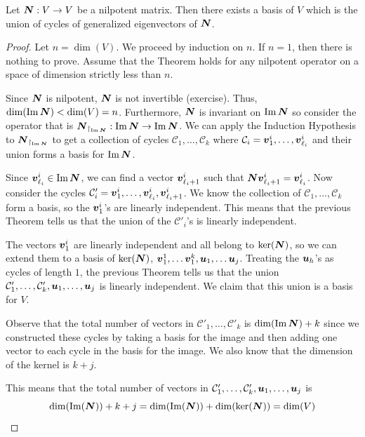 \begin{theorem}
    Let $\boldsymbol{N}:V\to V$ be a nilpotent matrix. Then there exists a basis of $V$ which is the union of cycles of generalized eigenvectors of $\boldsymbol{N}$.
\end{theorem}

\begin{proof}
    Let $n=\dim(V)$. We proceed by induction on $n$. If $n=1$, then there is nothing to prove. Assume that the Theorem holds for any nilpotent operator on a space of dimension strictly less than $n$.

    Since $\boldsymbol{N}$ is nilpotent, $\boldsymbol{N}$ is not invertible (exercise). Thus, $\dim(\operatorname{Im}\boldsymbol{N})<\dim(V)=n$. Furthermore, $\boldsymbol{N}$ is invariant on $\operatorname{Im}\boldsymbol{N}$ so consider the operator that is $\boldsymbol{N}_{\restriction_{\operatorname{Im}\boldsymbol{N}}}:\operatorname{Im}\boldsymbol{N}\to \operatorname{Im}\boldsymbol{N}$. We can apply the Induction Hypothesis to $\boldsymbol{N}_{\restriction_{\operatorname{Im}\boldsymbol{N}}}$ to get a collection of cycles $\mathcal{C}_1,\dots,\mathcal{C}_k$ where $\mathcal{C}_i=\boldsymbol{v}^i_1,\dots,\boldsymbol{v}^i_{\ell_i}$ and their union forms a basis for $\operatorname{Im}\boldsymbol{N}$.

    Since $\boldsymbol{v}^i_{\ell_i}\in\operatorname{Im}\boldsymbol{N}$, we can find a vector $\boldsymbol{v}^i_{\ell_i+1}$ such that $\boldsymbol{N}\boldsymbol{v}^i_{\ell_i+1}=\boldsymbol{v}^i_{\ell_i}$. Now consider the cycles $\mathcal{C}_i'=\boldsymbol{v}^i_1,\dots,\boldsymbol{v}^i_{\ell_i},\boldsymbol{v}^i_{\ell_i+1}$. We know the collection of $\mathcal{C}_1,\dots,\mathcal{C}_k$ form a basis, so the $\boldsymbol{v}_1^i$'s are linearly independent. This means that the previous Theorem tells us that the union of the $\mathcal{C}'_i$'s is linearly independent.

    The vectors $\boldsymbol{v}^i_1$ are linearly independent and all belong to $\ker(\boldsymbol{N})$, so we can extend them to a basis of $\ker(\boldsymbol{N})$, $\boldsymbol{v}^1_1,\dots\boldsymbol{v}^k_1,\boldsymbol{u}_1,\dots\boldsymbol{u}_j$. Treating the $\boldsymbol{u}_h$'s as cycles of length $1$, the previous Theorem tells us that the union $\mathcal{C}_1',\dots,\mathcal{C}_k',\boldsymbol{u}_1,\dots,\boldsymbol{u}_j$ is linearly independent. We claim that this union is a basis for $V$.

    Observe that the total number of vectors in $\mathcal{C}'_1,\dots,\mathcal{C}'_k$ is $\dim(\operatorname{Im}\boldsymbol{N})+k$ since we constructed these cycles by taking a basis for the image and then adding one vector to each cycle in the basis for the image. We also know that the dimension of the kernel is $k+j$.

    This means that the total number of vectors in $\mathcal{C}_1',\dots,\mathcal{C}_k',\boldsymbol{u}_1,\dots,\boldsymbol{u}_j$ is $$\dim(\operatorname{Im}(\boldsymbol{N}))+k+j=\dim(\operatorname{Im}(\boldsymbol{N}))+\dim(\ker(\boldsymbol{N}))=\dim(V)$$
\end{proof}

